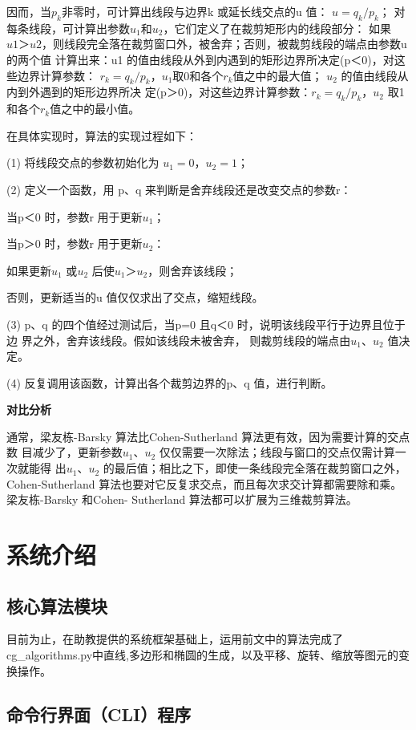 \documentclass[a4paper,UTF8]{article}
\theoremstyle{definition}
\begin{document}
因而，当$p_k$非零时，可计算出线段与边界k 或延长线交点的u 值：
$u=q_k/p_k$；
对每条线段，可计算出参数$u_1$和$u_2$，它们定义了在裁剪矩形内的线段部分：
如果$u1＞u2$，则线段完全落在裁剪窗口外，被舍弃；否则，被裁剪线段的端点由参数u 的两个值
计算出来：u1 的值由线段从外到内遇到的矩形边界所决定(p＜0)，对这些边界计算参数：
$r_k=q_k/p_k$，$u_1$取0和各个$r_k$值之中的最大值；
$u_2$ 的值由线段从内到外遇到的矩形边界所决
定(p＞0)，对这些边界计算参数：$r_k=q_k/p_k$，$u_2$ 取1和各个$r_k$值之中的最小值。

在具体实现时，算法的实现过程如下：

(1) 将线段交点的参数初始化为 $u_1=0，u_2=1$；

(2) 定义一个函数，用 p、q 来判断是舍弃线段还是改变交点的参数r：

    当p＜0 时，参数r 用于更新$u_1$；

    当p＞0 时，参数r 用于更新$u_2$：

    如果更新$u_1$ 或$u_2$ 后使$u_1＞u_2$，则舍弃该线段；

    否则，更新适当的u 值仅仅求出了交点，缩短线段。

(3) p、q 的四个值经过测试后，当p=0 且q＜0 时，说明该线段平行于边界且位于边
界之外，舍弃该线段。假如该线段未被舍弃，
则裁剪线段的端点由$u_1、u_2$ 值决定。

(4) 反复调用该函数，计算出各个裁剪边界的p、q 值，进行判断。\cite{move}

\textbf{对比分析}\par
通常，梁友栋-Barsky 算法比Cohen-Sutherland 算法更有效，因为需要计算的交点数
目减少了，更新参数$u_1、u_2$ 仅仅需要一次除法；线段与窗口的交点仅需计算一次就能得
出$u_1、u_2$ 的最后值；相比之下，即使一条线段完全落在裁剪窗口之外，Cohen-Sutherland
算法也要对它反复求交点，而且每次求交计算都需要除和乘。梁友栋-Barsky 和Cohen-
Sutherland 算法都可以扩展为三维裁剪算法。\cite{move}

\section{系统介绍}
\subsection{核心算法模块}
目前为止，在助教提供的系统框架基础上，运用前文中的算法完成了cg\_algorithms.py中直线,多边形和椭圆的生成，以及平移、旋转、缩放等图元的变换操作。
\subsection{命令行界面（CLI）程序}
\end{document}
